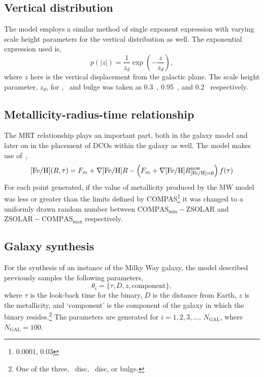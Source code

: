 \subsection{Vertical distribution}
\label{subsec:vertical_distribution}
The model employs a similar method of single exponent expression with varying scale height parameters for the vertical distribution as well.
The exponential expression used is,
\begin{equation}
    p(|z|) = \frac{1}{z_d}\exp\left(-\frac{z}{z_d}\right),
    \label{eq:vertical_distribution_of_stars}
\end{equation}
where $z$ here is the vertical displacement from the galactic plane.
The scale height parameter, $z_d$, for \lowalpha, \highalpha\ and bulge was taken as \SI{0.3}{\kpc}~\cite{McMillan2011}, \SI{0.95}{\kpc}~\cite{Bovy2016}, and \SI{0.2}{\kpc}~\cite{Wegg2015} respectively.

\subsection{Metallicity-radius-time relationship}
\label{subsec:metallicity_radius_relationship}
The MRT relationship plays an important part, both in the galaxy model and later on in the placement of DCOs within the galaxy as well.
The model makes use of~\cite[Eq. 7]{Frankel2018},
\begin{equation}
    \feh(R,\tau) = F_m + \nabla\feh R - \left(F_m + \nabla\feh R_{\feh=0}^{\text{now}}\right) f(\tau)
\end{equation}
For each point generated, if the value of metallicity produced by the MW model was less or greater than the limits defined by COMPAS\footnote{0.0001, 0.03} it was changed to a uniformly drawn random number between $\text{COMPAS}_\text{min} - \text{ZSOLAR}$ and $\text{ZSOLAR} - \text{COMPAS}_\text{max}$ respectively.
\subsection{Galaxy synthesis}
\label{subsec:galaxy_synthesis}
For the synthesis of an instance of the Milky Way galaxy, the model described previously samples the following parameters,
\begin{equation*}
    \theta_i = \{\tau, D, z, \text{component}\},
\end{equation*}
where $\tau$ is the look-back time for the binary, $D$ is the distance from Earth, $z$ is the metallicity, and `component' is the component of the galaxy in which the binary resides.\footnote{One of the three, \lowalpha\ disc, \highalpha\ disc, or bulge.}
The parameters are generated for $i = 1, 2, 3, \ldots$, $N_\text{GAL}$, where $N_\text{GAL} = 100$.